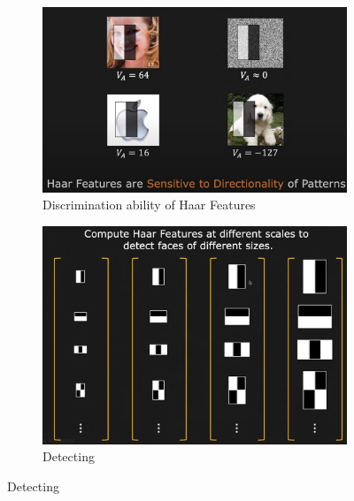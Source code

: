 \documentclass[12pt,a4paper]{article}
\begin{document}
\begin{large}
\begin{figure} [!hbp]
  \centering
    \begin{subfigure}[b]{0.4\textwidth}
    \centering
    \captionsetup{justification=centering}
      \includegraphics[width=\textwidth]{images/haar2.png}
      \caption{Discrimination ability of Haar Features}
      
    \end{subfigure}
    \hspace{0.1cm}
    \begin{subfigure}[b]{0.4\textwidth}
    \centering
    \captionsetup{justification=centering}
      \includegraphics[width=\textwidth]{images/haar3.png}
      \caption{Detecting }
      

\end{subfigure}
\end{figure}
\end{large}
\end{document}
